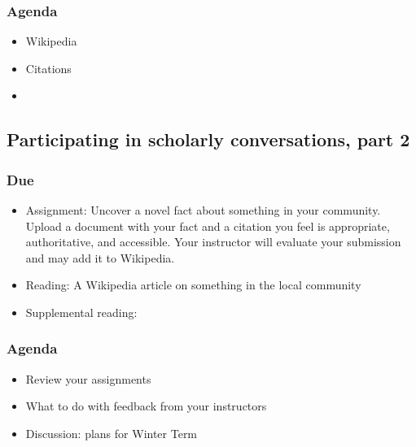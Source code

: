 \documentclass[12pt,article,oneside]{memoir}
\begin{document}
\subsubsection{Agenda}
\begin{itemize}
\item Wikipedia
\item Citations
\item 
\end{itemize}

\subsection{Participating in scholarly conversations, part 2}
\subsubsection{Due}
\begin{itemize}
 \item Assignment: Uncover a novel fact about something in your community.  Upload a document with your fact and a citation you feel is appropriate, authoritative, and accessible.  Your instructor will evaluate your submission and may add it to Wikipedia.
 \item Reading: A Wikipedia article on something in the local community
 \item Supplemental reading: \cite{doyle}
\end{itemize}

\subsubsection{Agenda}
\begin{itemize}
\item Review your assignments
\item What to do with feedback from your instructors
\item Discussion: plans for Winter Term
\end{itemize}



\newpage
\renewcommand{\bibname}{Reading list}
{}

\end{document}
